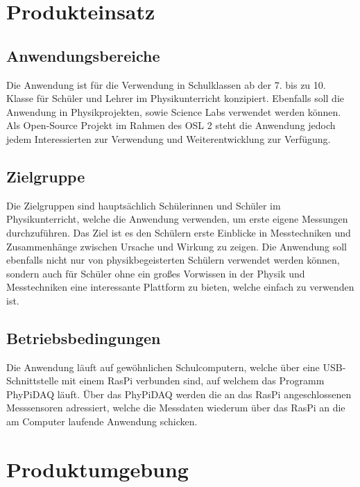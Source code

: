 \documentclass[parskip=full]{scrartcl}
\begin{document}
\section{Produkteinsatz}\label{produkteinsatz}

\subsection{Anwendungsbereiche}

Die Anwendung ist für die Verwendung in Schulklassen ab der 7. bis zu 10. Klasse für Schüler und Lehrer im Physikunterricht konzipiert. Ebenfalls soll die Anwendung in Physikprojekten, sowie \gls{Science Labs} verwendet werden können. 
Als \gls{Open-Source Projekt} im Rahmen des \gls{OSL 2} steht die Anwendung jedoch jedem Interessierten zur Verwendung und Weiterentwicklung zur Verfügung.


\subsection{Zielgruppe}

Die Zielgruppen sind hauptsächlich Schülerinnen und Schüler im Physikunterricht, welche die Anwendung verwenden, um erste eigene Messungen durchzuführen. Das Ziel ist es den Schülern erste Einblicke in Messtechniken und Zusammenhänge zwischen Ursache und Wirkung zu zeigen. 
Die Anwendung soll ebenfalls nicht nur von physikbegeisterten Schülern verwendet werden können, sondern auch für Schüler ohne ein großes Vorwissen in der Physik und Messtechniken eine interessante Plattform zu bieten, welche einfach zu verwenden ist.

\subsection{Betriebsbedingungen}

Die Anwendung läuft auf gewöhnlichen Schulcomputern, welche über eine USB-Schnittstelle mit einem \gls{RasPi} verbunden sind, auf welchem das Programm \gls{PhyPiDAQ} läuft. Über das \gls{PhyPiDAQ} werden die an das \gls{RasPi} angeschlossenen Messsensoren adressiert, welche die Messdaten wiederum über das \gls{RasPi} an die am Computer laufende Anwendung schicken. 


\section{Produktumgebung}\label{produktumgebung}
\end{document}
